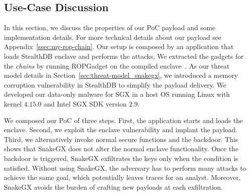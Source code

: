 \subsection{Use-Case Discussion}
\label{ssec:homemade-poc}

In this section, we discuss the properties of 
our PoC payload and some implementation details. For more technical 
details about our payload see Appendix~\ref{ssec:my-rop-chain}.
Our setup is composed by an application that loads StealthDB enclave 
and performs the attacks.
We extracted the gadgets for the \emph{chains} by running ROPGadget on the 
compiled enclave~\citep{ropgadget}.
As our threat model details in Section~\ref{sec:threat-model_snakegx}, we 
introduced a memory corruption vulnerability in StealthDB to simplify the 
payload delivery.
We developed our data-only malware for SGX in a host OS running Linux with 
kernel $4.15.0$ and Intel SGX SDK version $2.9$.

We composed our PoC of three steps.
First, the application starts and loads the enclave.
Second, we exploit the enclave vulnerability and implant 
the payload.
Third, we alternatively invoke normal secure functions and
the backdoor. This shows that SnakeGX does not alter the normal enclave 
functionality.
Once the backdoor is triggered, SnakeGX exfiltrates the keys only when the 
condition is satisfied.
Without using SnakeGX, the adversary has to perform many 
attacks to achieve the same goal, which potentially leaves traces for an 
analyst.
Moreover, SnakeGX avoids the burden of crafting new payloads at each 
exfiltration.

